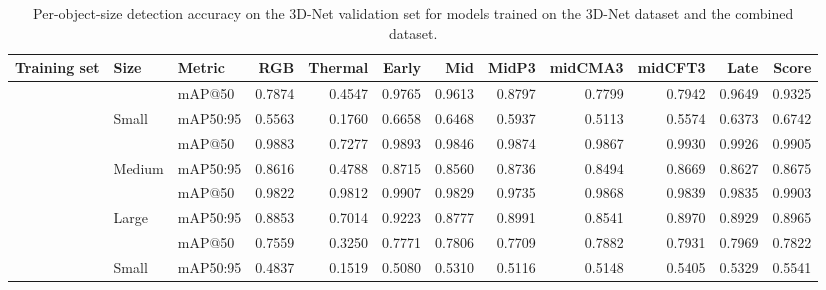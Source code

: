 \documentclass[12pt,oneside,bibtotoc,liststotoc]{scrbook}
\begin{document}
\begin{table}[H]
    \centering
    \caption{Per-object-size detection accuracy on the 3D-Net validation set for models
        trained on the 3D-Net dataset and the combined dataset.}
    \label{tab:acc_3dnet_size}
    \begin{adjustbox}{max width=\textwidth}
        \begin{tabular}{|l l l r r r r r r r r r|}
            \toprule
            \rowcolor{white}
            \textbf{Training set} & \textbf{Size}           & \textbf{Metric}
                                  & \textbf{RGB}            & \textbf{Thermal} & \textbf{Early}
                                  & \textbf{Mid}            & \textbf{MidP3}   & \textbf{midCMA3}
                                  & \textbf{midCFT3}        & \textbf{Late}    & \textbf{Score}                                           \\
            \midrule
            \rowcolor{rowlight}   &                         & mAP@50   & 0.7874 & 0.4547 & 0.9765 & 0.9613 & 0.8797 & 0.7799 & 0.7942 & 0.9649 & 0.9325 \\
            \rowcolor{rowlight}   & \multirow{-2}{*}{Small} & mAP50:95 & 0.5563 & 0.1760 & 0.6658 & 0.6468 & 0.5937 & 0.5113 & 0.5574 & 0.6373 & 0.6742 \\
            \cmidrule{2-12}
            \rowcolor{rowlight}   &                         & mAP@50   & 0.9883 & 0.7277 & 0.9893 & 0.9846 & 0.9874 & 0.9867 & 0.9930 & 0.9926 & 0.9905 \\
            \rowcolor{rowlight}   & \multirow{-2}{*}{Medium} & mAP50:95 & 0.8616 & 0.4788 & 0.8715 & 0.8560 & 0.8736 & 0.8494 & 0.8669 & 0.8627 & 0.8675 \\
            \cmidrule{2-12}
            \rowcolor{rowlight}   &                         & mAP@50   & 0.9822 & 0.9812 & 0.9907 & 0.9829 & 0.9735 & 0.9868 & 0.9839 & 0.9835 & 0.9903 \\
            \rowcolor{rowlight} \multirow{-6}{*}{3D-Net} & \multirow{-2}{*}{Large} & mAP50:95 & 0.8853 & 0.7014 & 0.9223 & 0.8777 & 0.8991 & 0.8541 & 0.8970 & 0.8929 & 0.8965 \\
            \midrule
            \rowcolor{rowdark}    &                         & mAP@50   & 0.7559 & 0.3250 & 0.7771 & 0.7806 & 0.7709 & 0.7882 & 0.7931 & 0.7969 & 0.7822 \\
            \rowcolor{rowdark}    & \multirow{-2}{*}{Small} & mAP50:95 & 0.4837 & 0.1519 & 0.5080 & 0.5310 & 0.5116 & 0.5148 & 0.5405 & 0.5329 & 0.5541 \\

\end{tabular}
\end{adjustbox}
\end{table}
\end{document}
